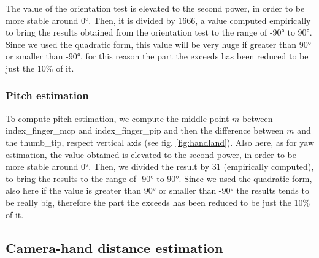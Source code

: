 \noindent The value of the orientation test is elevated to the second power, in order to be more stable around \ang{0}. Then, it is divided by $1666$, a value computed empirically to bring the results obtained from the orientation test to the range of \ang{-90} to \ang{+90}. Since we used the quadratic form, this value will be very huge if greater than \ang{+90} or smaller than \ang{-90}, for this reason the part the exceeds has been reduced to be just the $10\%$ of it.

\subsubsection{Pitch estimation}
\label{subsec:pitch}
To compute pitch estimation, we compute the middle point $m$ between index\_finger\_mcp and index\_finger\_pip and then the difference between $m$ and the thumb\_tip, respect vertical axis (see fig. \ref{fig:handland}). Also here, as for yaw estimation, the value obtained is elevated to the second power, in order to be more stable around \ang{0}. Then, we divided the result by $31$ (empirically computed), to bring the results to the range of \ang{-90} to \ang{90}. Since we used the quadratic form, also here if the value is greater than \ang{90} or smaller than \ang{-90} the results tends to be really big, therefore the part the exceeds has been reduced to be just the 10\% of it.

\subsection{Camera-hand distance estimation}
\label{subsec:cam-hand}
%
%

